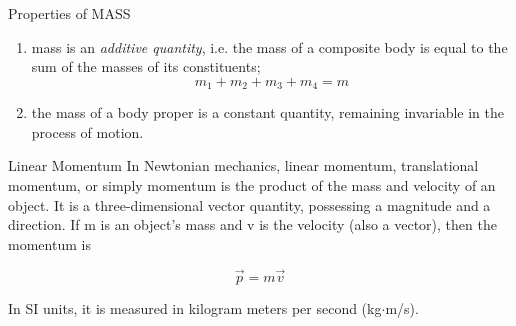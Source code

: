 \documentclass[18pt]{LectMechanics}
\begin{document}
\begin{frame}{Properties of MASS}{}
	\begin{enumerate}
		\item mass is an \emph{additive quantity}, i.e. the mass of a
		      composite body is equal to the sum of the masses of its constituents;
		      \begin{equation*}
			      m_1 + m_2 + m_3 + m_4 = m
		      \end{equation*}
		      \begin{center}
		      \end{center}
		\item the mass of a body proper is a constant quantity, remaining invariable in the process of motion.
	\end{enumerate}
\end{frame}

\begin{frame}{Linear Momentum}{}
	In Newtonian mechanics, linear momentum, translational momentum, or simply momentum is the product of the mass and velocity of an object. It is a three-dimensional vector quantity, possessing a magnitude and a direction. If m is an object's mass and v is the velocity (also a vector), then the momentum is

	\begin{equation*}
		\vec p = m\vec v
	\end{equation*}

	In SI units, it is measured in kilogram meters per second (kg$\cdot$m/s).
\end{frame}
\end{document}

